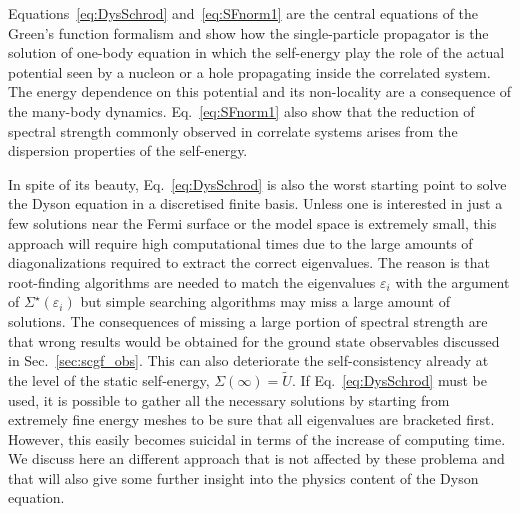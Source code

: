 Equations~\eqref{eq:DysSchrod} and~\eqref{eq:SFnorm1} are the central equations of the Green's function formalism and show how the 
single-particle propagator is the solution of one-body equation in which the self-energy play the role of the actual potential seen by a nucleon or a
hole propagating inside the correlated system. The energy dependence on this potential and its non-locality are a consequence of the many-body
dynamics. Eq.~\eqref{eq:SFnorm1} also show that the reduction of spectral strength commonly observed in correlate systems arises from the dispersion
properties of the self-energy.

 In spite of its beauty, Eq.~\eqref{eq:DysSchrod} is also the worst starting point to solve the Dyson equation in a discretised finite basis. Unless one is interested in just a few solutions near the Fermi surface or the model space is extremely small, this approach will require high computational times due to the large amounts of diagonalizations required to extract the correct eigenvalues. The reason is that root-finding algorithms are needed to match the eigenvalues $\varepsilon_i$ with the argument of  $\Sigma^\star(\varepsilon_i)$ but simple searching algorithms may miss a large amount of solutions. The consequences of missing a large portion of spectral strength are that wrong results would be obtained for the ground state observables discussed in Sec.~\ref{sec:scgf_obs}. This can also deteriorate the self-consistency already at the level of the static self-energy, $\Sigma{(\infty)}=\tilde{U}$.  If Eq.~\eqref{eq:DysSchrod} must be used, it is possible to gather all the necessary solutions by starting from extremely fine energy meshes to be sure that all eigenvalues are bracketed first. However, this easily becomes suicidal in terms of the increase of computing time.
We discuss here an different approach that is not affected by these problema and that will also give some further insight into the physics content of the Dyson equation.

